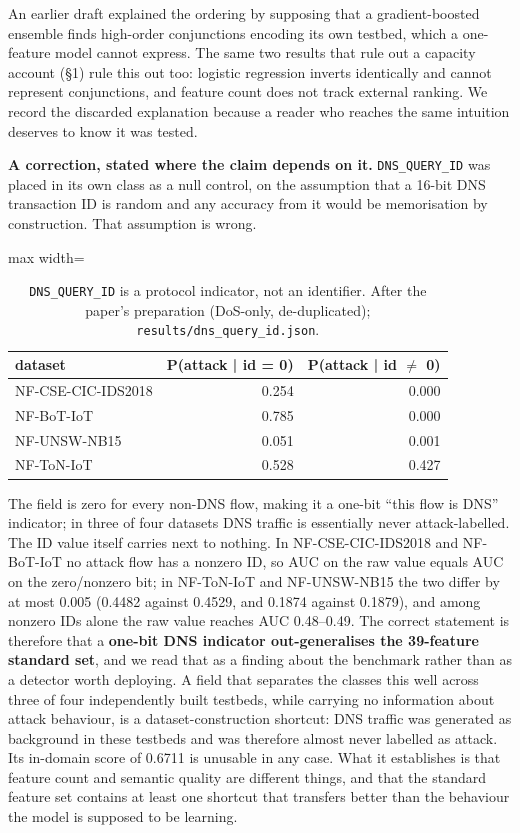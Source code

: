 \documentclass[preprint,12pt,nopreprintline]{elsarticle}
\begin{document}
An earlier draft explained the ordering by supposing that a gradient-boosted ensemble finds high-order conjunctions encoding its own testbed, which a one-feature model cannot express. The same two results that rule out a capacity account (\S{}1) rule this out too: logistic regression inverts identically and cannot represent conjunctions, and feature count does not track external ranking. We record the discarded explanation because a reader who reaches the same intuition deserves to know it was tested.

\textbf{A correction, stated where the claim depends on it.} \texttt{DNS\_QUERY\_ID} was placed in its own class as a null control, on the assumption that a 16-bit DNS transaction ID is random and any accuracy from it would be memorisation by construction. That assumption is wrong.

\begin{table}[htbp]\centering\scriptsize
\caption{\texttt{DNS\_QUERY\_ID} is a protocol indicator, not an identifier. After the paper's preparation (DoS-only, de-duplicated); \texttt{results/dns\_query\_id.json}.}
\begin{adjustbox}{max width=\textwidth}\begin{tabular}{lrr}
\toprule
dataset & P(attack | id = 0) & P(attack | id \ensuremath{\neq} 0) \\
\midrule
NF-CSE-CIC-IDS2018 & 0.254 & 0.000 \\
NF-BoT-IoT & 0.785 & 0.000 \\
NF-UNSW-NB15 & 0.051 & 0.001 \\
NF-ToN-IoT & 0.528 & 0.427 \\
\bottomrule
\end{tabular}\end{adjustbox}
\end{table}

The field is zero for every non-DNS flow, making it a one-bit ``this flow is DNS'' indicator; in three of four datasets DNS traffic is essentially never attack-labelled. The ID value itself carries next to nothing. In NF-CSE-CIC-IDS2018 and NF-BoT-IoT no attack flow has a nonzero ID, so AUC on the raw value equals AUC on the zero/nonzero bit; in NF-ToN-IoT and NF-UNSW-NB15 the two differ by at most 0.005 (0.4482 against 0.4529, and 0.1874 against 0.1879), and among nonzero IDs alone the raw value reaches AUC 0.48--0.49. The correct statement is therefore that a \textbf{one-bit DNS indicator out-generalises the 39-feature standard set}, and we read that as a finding about the benchmark rather than as a detector worth deploying. A field that separates the classes this well across three of four independently built testbeds, while carrying no information about attack behaviour, is a dataset-construction shortcut: DNS traffic was generated as background in these testbeds and was therefore almost never labelled as attack. Its in-domain score of 0.6711 is unusable in any case. What it establishes is that feature count and semantic quality are different things, and that the standard feature set contains at least one shortcut that transfers better than the behaviour the model is supposed to be learning.
\end{document}

